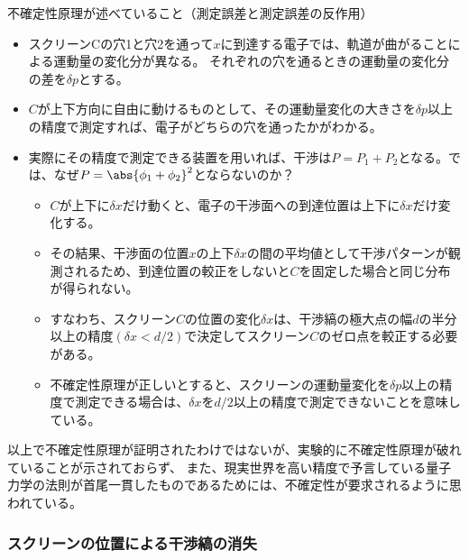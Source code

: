 \documentclass[11pt,aspectratio=169,xcolor=dvipsnames,table,dvipdfmx]{beamer}
\begin{document}
\begin{frame}{不確定性原理が述べていること（測定誤差と測定誤差の反作用）}
    \begin{itemize}
      \item スクリーンCの穴1と穴2を通って$x$に到達する電子では、軌道が曲がることによる運動量の変化分が異なる。
      それぞれの穴を通るときの運動量の変化分の差を$\delta p$とする。
      \item $C$が上下方向に自由に動けるものとして、その運動量変化の大きさを$\delta p$以上の精度で測定すれば、電子がどちらの穴を通ったかがわかる。
      \item 実際にその精度で測定できる装置を用いれば、干渉は$P=P_1+P_2$となる。では、なぜ$P=\abs{\phi_1+\phi_2}^2$とならないのか？
      \begin{itemize}
      \item $C$が上下に$\delta x$だけ動くと、電子の干渉面への到達位置は上下に$\delta x$だけ変化する。
      \item その結果、干渉面の位置$x$の上下$\delta x$の間の平均値として干渉パターンが観測されるため、到達位置の較正をしないと$C$を固定した場合と同じ分布が得られない。
      \item すなわち、スクリーン$C$の位置の変化$\delta x$は、干渉縞の極大点の幅$d$の半分以上の精度$(\delta x <d/2)$で決定してスクリーン$C$のゼロ点を較正する必要がある。
      \item 不確定性原理が正しいとすると、スクリーンの運動量変化を$\delta p$以上の精度で測定できる場合は、$\delta x$を$d/2$以上の精度で測定できないことを意味している。
      \end{itemize}
    \end{itemize}
  以上で不確定性原理が証明されたわけではないが、実験的に不確定性原理が破れていることが示されておらず、
  また、現実世界を高い精度で予言している量子力学の法則が首尾一貫したものであるためには、不確定性が要求されるように思われている。
\end{frame}

\begin{frame}
  \frametitle{スクリーンの位置による干渉縞の消失}
\begin{center}
\end{center}
\end{frame}
\end{document}

